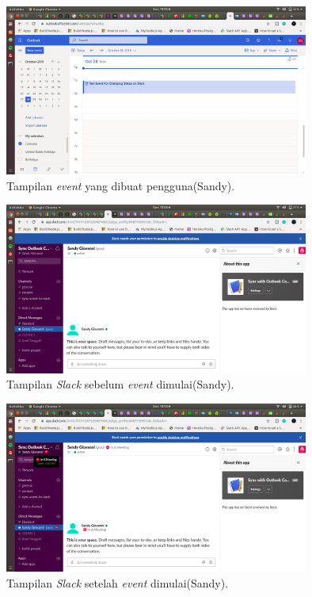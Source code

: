 \begin{figure}[h]
  \includegraphics[width=10cm]{./Gambar/PengujianSandy/Outlook.png}
  \centering
  \caption{Tampilan \textit{event} yang dibuat pengguna(Sandy).}
  \label{fig:outlook_sandy}
\end{figure}

\begin{figure}[h]
  \includegraphics[width=10cm]{./Gambar/PengujianSandy/Slack_Before.png}
  \centering
  \caption{Tampilan \textit{Slack} sebelum \textit{event} dimulai(Sandy).}
  \label{fig:slack_before_sandy}
\end{figure}

\begin{figure}[h]
  \includegraphics[width=10cm]{./Gambar/PengujianSandy/Slack_After.png}
  \centering
  \caption{Tampilan \textit{Slack} setelah \textit{event} dimulai(Sandy).}
  \label{fig:slack_after_sandy}
\end{figure}

